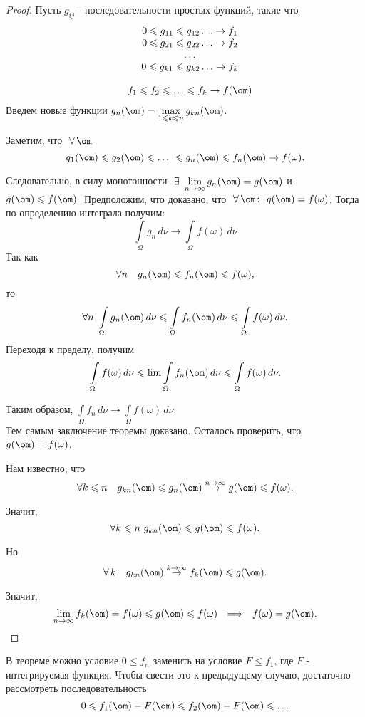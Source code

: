 \documentclass[a4paper]{article}
\newcommand{\dn}{\,d\nu}
\newcommand{\nsb}{n\rightarrow \infty} %
\newcommand{\fo}{f(\omega)}
\newcommand{\io} {\int \limits_{\Omega}}
\newcommand{\ii} {\io \fo \, d\nu}
\begin{document}
\begin{proof}
Пусть $g_{ij}$ -  последовательности простых функций, такие что
\[ \begin{array}{cc}
 & 0 \leqslant g_{11} \leqslant g_{12} \ldots \rightarrow f_1 \\
 & 0 \leqslant g_{21} \leqslant g_{22} \ldots \rightarrow f_2 \\
 & \ldots \\
 & 0 \leqslant g_{k1} \leqslant g_{k2} \ldots \rightarrow f_k \\
 &\\
 & f_1 \leqslant f_2 \leqslant \ldots \leqslant f_k \rightarrow f(\om)\\
\end{array} \]
Введем новые функции $g_n(\om)=\max \limits_{1\leqslant k
\leqslant n} g_{kn}(\om)$.

Заметим, что $\ \forall \, \om$
$$
g_1(\om) \leqslant g_2(\om) \leqslant \ldots \ \leqslant g_n(\om)
\leqslant f_n(\om)\rightarrow \fo.$$

Следовательно, в силу монотонности $\ \exists \ \lim
\limits_{\nsb} g_n(\om) = g(\om)$ и  $g(\om) \leqslant f(\om).$
Предположим, что доказано, что $\ \forall \, \om\colon \
g(\om)=\fo$. Тогда по определению интеграла получим: $$ \io g_n
\dn \rightarrow \ii$$ Так как
$$\forall n \quad g_n(\om) \leqslant f_n(\om) \leqslant \fo, $$ то
$$\forall n
\ \io g_n(\om) \dn \leqslant \io f_n(\om) \dn \leqslant \ii.$$
Переходя к пределу, получим $$\ii \leqslant \lim\io f_n(\om) \dn
\leqslant \ii.$$

Таким образом, $ \io f_n \dn \rightarrow \ii$.\\
Тем самым заключение теоремы доказано. Осталось проверить, что
$g(\om) = \fo$.

Нам известно, что
$$
\forall k \leqslant n \quad g_{kn}(\om) \leqslant g_n(\om)
\stackrel{\nsb}{\rightarrow}g(\om) \leqslant \fo. $$

Значит,
$$
\forall k \leqslant n \ g_{kn} (\om) \leqslant g(\om) \leqslant
\fo.$$

Но
$$
\forall \, k \quad g_{kn}(\om)\stackrel{k \rightarrow
\infty}{\rightarrow} f_k(\om) \leqslant g(\om).$$


Значит,
$$
\lim \limits_{\nsb} f_k(\om)= \fo \leqslant g(\om) \leqslant \fo \
\ \Longrightarrow \ \  \fo=g(\om).$$
\end{proof}
\begin{note}
В теореме можно условие $0 \leqslant f_n$ заменить на условие $F
\leqslant f_1$, где $F$ - интегрируемая функция. Чтобы свести это
к предыдущему случаю, достаточно рассмотреть последовательность
$$
0 \leqslant f_1(\om) - F(\om) \leqslant f_2(\om) - F(\om)
\leqslant \ldots
$$
\end{note}
\end{document}
